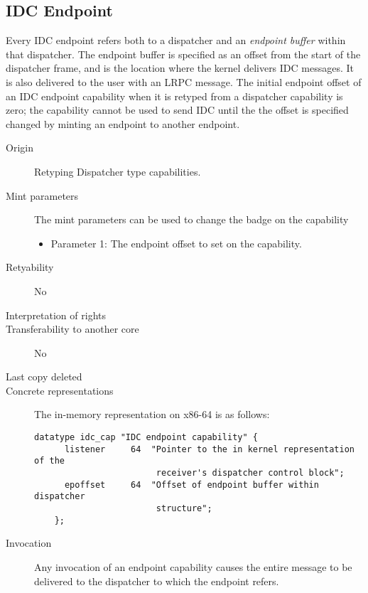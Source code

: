 \subsection{IDC Endpoint}
    
Every IDC endpoint refers both to a dispatcher and an \emph{endpoint
  buffer} within that dispatcher. The endpoint buffer is specified as
an offset from the start of the dispatcher frame, and is the location
where the kernel delivers IDC messages. It is also delivered to the
user with an LRPC message.  The initial endpoint offset of an IDC
endpoint capability when it is retyped from a dispatcher capability is
zero; the capability cannot be used to send IDC until the the offset
is specified changed by minting an endpoint to another endpoint.

\begin{description}
\item[Origin] Retyping Dispatcher type capabilities.

\item[Mint parameters] The mint parameters can be used to change the
  badge on the capability
  \begin{itemize}
  \item Parameter 1: The endpoint offset to set on the capability.
  \end{itemize}
  
\item[Retyability] No
  
\item[Interpretation of rights] 
  
\item[Transferability to another core] No

\item[Last copy deleted] 
  
\item[Concrete representations] The in-memory representation on x86-64
  is as follows:
  
  \begin{lstlisting}[language=Mackerel]
    datatype idc_cap "IDC endpoint capability" {
      listener     64  "Pointer to the in kernel representation of the
                        receiver's dispatcher control block";
      epoffset     64  "Offset of endpoint buffer within dispatcher
                        structure";
    };
  \end{lstlisting}
  
\item[Invocation] Any invocation of an endpoint capability causes the
  entire message to be delivered to the dispatcher to which the
  endpoint refers.
  \end{description}

